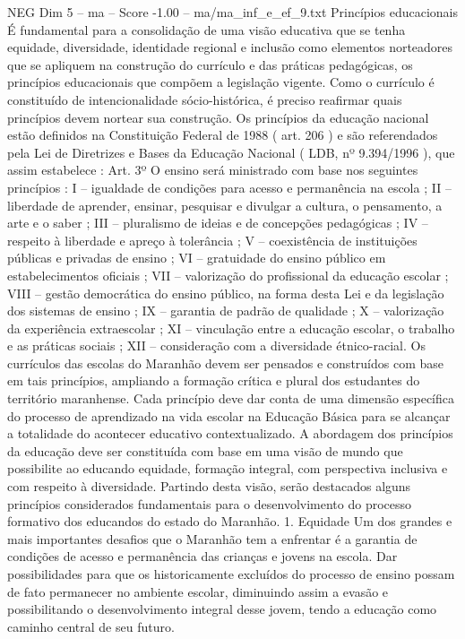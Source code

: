 \begin{textsample}{NEG Dim 5 – ma – Score -1.00 – ma/ma\_inf\_e\_ef\_9.txt}  \label{ex:f5_neg_115}
Princípios educacionais É fundamental para a consolidação de uma visão educativa que se tenha equidade, diversidade, identidade regional e inclusão como elementos norteadores que se apliquem na construção do currículo e das práticas pedagógicas, os princípios educacionais que compõem a legislação vigente.
Como o currículo é constituído de intencionalidade sócio-histórica, é preciso reafirmar quais princípios devem nortear sua construção.
Os princípios da educação nacional estão definidos na Constituição Federal de 1988 ( art. 206 ) e são referendados pela Lei de Diretrizes e Bases da Educação Nacional ( LDB, nº 9.394/1996 ), que assim estabelece : Art. 3º O ensino será ministrado com base nos seguintes princípios : I – igualdade de condições para acesso e permanência na escola ; II – liberdade de aprender, ensinar, pesquisar e divulgar a cultura, o pensamento, a arte e o saber ; III – pluralismo de ideias e de concepções pedagógicas ; IV – respeito à liberdade e apreço à tolerância ; V – coexistência de instituições públicas e privadas de ensino ; VI – gratuidade do ensino público em estabelecimentos oficiais ; VII – valorização do profissional da educação escolar ; VIII – gestão democrática do ensino público, na forma desta Lei e da legislação dos sistemas de ensino ; IX – garantia de padrão de qualidade ; X – valorização da experiência extraescolar ; XI – vinculação entre a educação escolar, o trabalho e as práticas sociais ; XII – consideração com a diversidade étnico-racial.
Os currículos das escolas do Maranhão devem ser pensados e construídos com base em tais princípios, ampliando a formação crítica e plural dos estudantes do território maranhense.
Cada princípio deve dar conta de uma dimensão específica do processo de aprendizado na vida escolar na Educação Básica para se alcançar a totalidade do acontecer educativo contextualizado.
A abordagem dos princípios da educação deve ser constituída com base em uma visão de mundo que possibilite ao educando equidade, formação integral, com perspectiva inclusiva e com respeito à diversidade.
Partindo desta visão, serão destacados alguns princípios considerados fundamentais para o desenvolvimento do processo formativo dos educandos do estado do Maranhão. 1.
Equidade Um dos grandes e mais importantes desafios que o Maranhão tem a enfrentar é a garantia de condições de acesso e permanência das crianças e jovens na escola.
Dar possibilidades para que os historicamente excluídos do processo de ensino possam de fato permanecer no ambiente escolar, diminuindo assim a evasão e possibilitando o desenvolvimento integral desse jovem, tendo a educação como caminho central de seu futuro.

\end{textsample}
